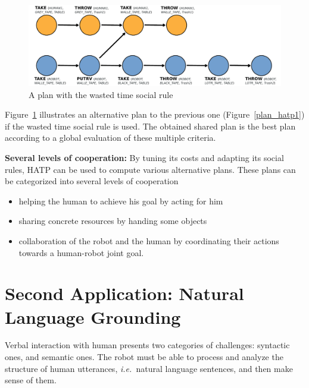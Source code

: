 \documentclass{svmult}
\newcommand{\ie}{{\textit{i.e.~}}}
\begin{document}
\begin{figure}[htbp]
  \centering
  \includegraphics[width=0.95\columnwidth]{./figs/plan2.pdf}
  \caption{A plan with the wasted time social rule}
  \label{plan_hatp2}
\end{figure}

Figure~\ref{plan_hatp2} illustrates an alternative plan to the previous 
one (Figure~\ref{plan_hatp1}) if the wasted time social rule is used.
The obtained shared plan is the best plan according to a global evaluation of
these multiple criteria.

\vspace{0.3cm}
\noindent
\textbf{Several levels of cooperation:} 
By tuning its costs
and adapting its social rules, HATP can be used to compute various
alternative plans. These plans can be categorized into several levels
of cooperation

\begin{itemize}
\item helping the human to achieve his goal by acting for him
\item sharing concrete resources by handing some objects
\item collaboration of the robot and the human by coordinating their
  actions towards a human-robot joint goal.
\end{itemize}





\section{Second Application: Natural Language Grounding}
\label{dialog}


Verbal interaction with human presents two categories of challenges: syntactic
ones, and semantic ones. The robot must be able to process and analyze the
structure of human utterances, \ie natural language sentences, and then make
sense of them. 
\end{document}
